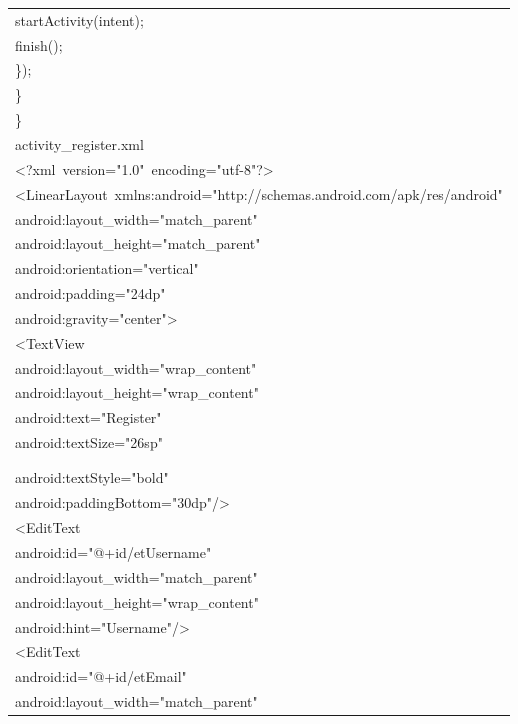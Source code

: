 \documentclass[a4paper,12pt]{article}
\begin{document}
\begin{longtable}{|p{}|}
{\ttfamily\small startActivity(intent);} \\
{\ttfamily\small finish();} \\
{\ttfamily\small \});} \\
{\ttfamily\small \}} \\
{\ttfamily\small \}} \\
{\ttfamily\small activity\_register.xml} \\
{\ttfamily\small \textless{}?xml\ version="1.0"\ encoding="utf-8"?\textgreater{}} \\
{\ttfamily\small \textless{}LinearLayout\ xmlns:android="http://schemas.android.com/apk/res/android"} \\
{\ttfamily\small android:layout\_width="match\_parent"} \\
{\ttfamily\small android:layout\_height="match\_parent"} \\
{\ttfamily\small android:orientation="vertical"} \\
{\ttfamily\small android:padding="24dp"} \\
{\ttfamily\small android:gravity="center"\textgreater{}} \\
{\ttfamily\small \textless{}TextView} \\
{\ttfamily\small android:layout\_width="wrap\_content"} \\
{\ttfamily\small android:layout\_height="wrap\_content"} \\
{\ttfamily\small android:text="Register"} \\
{\ttfamily\small android:textSize="26sp"} \\
\strut \\
\strut \\
{\ttfamily\small android:textStyle="bold"} \\
{\ttfamily\small android:paddingBottom="30dp"/\textgreater{}} \\
{\ttfamily\small \textless{}EditText} \\
{\ttfamily\small android:id="@+id/etUsername"} \\
{\ttfamily\small android:layout\_width="match\_parent"} \\
{\ttfamily\small android:layout\_height="wrap\_content"} \\
{\ttfamily\small android:hint="Username"/\textgreater{}} \\
{\ttfamily\small \textless{}EditText} \\
{\ttfamily\small android:id="@+id/etEmail"} \\
{\ttfamily\small android:layout\_width="match\_parent"} \\

\end{longtable}
\end{document}
